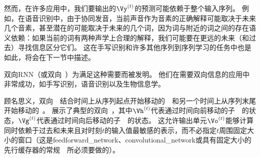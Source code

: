 然而，在许多应用中，我们要输出的$\Vy^{(t)}$的预测可能依赖于整个输入序列。
例如，在语音识别中，由于协同发音，当前声音作为音素的正确解释可能取决于未来几个音素，甚至潜在的可能取决于未来的几个词，因为词与附近的词之间的存在语义依赖：如果当前的词有两种声学上合理的解释，我们可能要在更远的未来（和过去）寻找信息区分它们。
这在手写识别和许多其他序列到序列学习的任务中也是如此，将会在下一节中描述。

双向\gls{RNN}（或双向~）为满足这种需要而被发明\citep{Schuster+Paliwal-1997}。
他们在需要双向信息的应用中非常成功\citep{Graves-book2012}，如手写识别\citep{Graves-et-al-NIPS2007,Graves+Schmidhuber-2009}，语音识别\citep{Graves+Schmidhuber-2005,Graves-et-al-ICASSP2013}以及生物信息学\citep{Baldi-et-al-1999}。

顾名思义，双向~~结合时间上从序列起点开始移动的~~和另一个时间上从序列末尾开始移动的~。
展示了典型的双向~，其中$\Vh^{(t)}$代表通过时间向前移动的子~~的状态，$\Vg^{(t)}$代表通过时间向后移动的子~~的状态。
这允许输出单元$\Vo^{(t)}$能够计算同时依赖于过去和未来且对时刻$t$的输入值最敏感的表示，而不必指定$t$周围固定大小的窗口（这是\gls{feedforward_network}、\gls{convolutional_network}或具有固定大小的先行缓存器的常规~~所必须要做的）。


